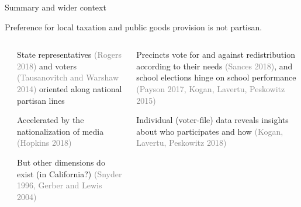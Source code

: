 \documentclass[ignorenonframetext,notes, 10pt, aspectratio=169]{beamer}
\begin{document}
\begin{frame}{Summary and wider context}

\begin{tcolorbox}
Preference for local taxation and public goods provision is not partisan.  
\end{tcolorbox}
\pause
\small

\begin{columns}[T]
\begin{column}{0.2\textwidth}

\end{column}
\begin{column}{0.4\textwidth}

\begin{wideitemize}
\item State representatives \textcolor{gray}{(Rogers 2018)} and voters \textcolor{gray}{(Tausanovitch and Warshaw 2014)} oriented along national partisan lines
\item Accelerated by the nationalization of media \textcolor{gray}{(Hopkins 2018)}
\item But other dimensions do exist (in California?) \textcolor{gray}{(Snyder 1996, Gerber and Lewis  2004)}
\end{wideitemize}

\end{column}

\begin{column}{0.4\textwidth}

\begin{wideitemize}
\item Precincts vote for and against redistribution according to their needs \textcolor{gray}{(Sances 2018)}, and school elections hinge on school performance \textcolor{gray}{(Payson 2017, Kogan, Lavertu, Peskowitz 2015)}
\item Individual (voter-file) data reveals insights about who participates and how \textcolor{gray}{(Kogan, Lavertu, Peskowitz 2018)}
\end{wideitemize}
\end{column}
\end{columns}

\end{frame}
\end{document}
